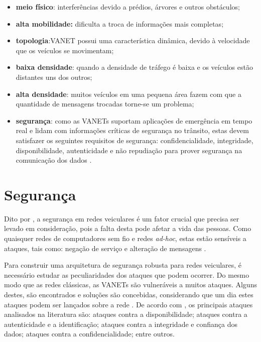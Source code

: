\documentclass[
	12pt,				%
	oneside,			%
	a4paper,			%
	english,			%
	brazil				%
	]{abntex2ppgsi}
\begin{document}
\begin{itemize}
	\item{\textbf{meio físico}: interferências devido a prédios,  árvores e outros obstáculos;}
	\item{\textbf{alta mobilidade:} dificulta a troca de informações mais completas; }
	\item{\textbf{topologia}:VANET possui uma característica dinâmica, devido à velocidade que os veículos se movimentam;}	
	\item{\textbf{baixa densidade}: quando a densidade de tráfego é baixa e os veículos estão distantes uns dos outros;}
	\item{\textbf{alta densidade}: muitos veículos em uma pequena área fazem com que a quantidade de mensagens trocadas torne-se um problema;}
	\item{\textbf{segurança}: como as VANETs suportam aplicações de emergência em tempo real e lidam com informações	críticas de segurança no trânsito, estas devem satisfazer os seguintes requisitos de segurança: confidencialidade, integridade, disponibilidade, autenticidade e não repudiação para prover segurança na comunicação dos dados \cite{samara2010security} \cite{matos2013analise}.}
	
\end{itemize} 



\section{Segurança}

Dito por , a segurança em redes veiculares é um fator crucial que precisa ser levado em consideração, pois a falta desta pode afetar a vida das pessoas. Como quaisquer redes de computadores sem fio e redes \textit{ad-hoc}, estas estão sensíveis a ataques, tais como: 	negação de serviço e alteração de mensagens \cite{raya2006securing}.

Para construir uma arquitetura de segurança robusta para redes veiculares, é necessário estudar as peculiaridades dos ataques que podem ocorrer. Do mesmo modo que as redes clássicas, as VANETs são vulneráveis a muitos ataques. Alguns destes, são encontrados e soluções são concebidas, considerando que um dia estes ataques podem ser lançados sobre a rede \cite{engoulou2014vanet}. De acordo com ,  os principais ataques analisados na literatura são: ataques contra a disponibilidade; ataques contra a autenticidade e a identificação; ataques contra a integridade e confiança dos dados; ataques contra a confidencialidade; entre outros.
\end{document}
